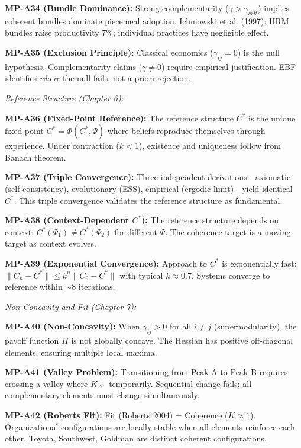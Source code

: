 \begin{tcolorbox}[colback=gray!5!white, colframe=gray!75!black,
    title=\textbf{MP Axioms}]
\textbf{MP-A34 (Bundle Dominance):} Strong complementarity ($\gamma > \gamma_{crit}$) implies coherent bundles dominate piecemeal adoption. Ichniowski et al. (1997): HRM bundles raise productivity 7\%; individual practices have negligible effect.

\textbf{MP-A35 (Exclusion Principle):} Classical economics ($\gamma_{ij} = 0$) is the null hypothesis. Complementarity claims ($\gamma \neq 0$) require empirical justification. EBF identifies \textit{where} the null fails, not a priori rejection.

\vspace{0.5em}
\textit{Reference Structure (Chapter 6):}

\textbf{MP-A36 (Fixed-Point Reference):} The reference structure $C^*$ is the unique fixed point $C^* = \Phi(C^*, \Psi)$ where beliefs reproduce themselves through experience. Under contraction ($k < 1$), existence and uniqueness follow from Banach theorem.

\textbf{MP-A37 (Triple Convergence):} Three independent derivations---axiomatic (self-consistency), evolutionary (ESS), empirical (ergodic limit)---yield identical $C^*$. This triple convergence validates the reference structure as fundamental.

\textbf{MP-A38 (Context-Dependent $C^*$):} The reference structure depends on context: $C^*(\Psi_1) \neq C^*(\Psi_2)$ for different $\Psi$. The coherence target is a moving target as context evolves.

\textbf{MP-A39 (Exponential Convergence):} Approach to $C^*$ is exponentially fast: $\|C_n - C^*\| \leq k^n \|C_0 - C^*\|$ with typical $k \approx 0.7$. Systems converge to reference within $\sim$8 iterations.

\vspace{0.5em}
\textit{Non-Concavity and Fit (Chapter 7):}

\textbf{MP-A40 (Non-Concavity):} When $\gamma_{ij} > 0$ for all $i \neq j$ (supermodularity), the payoff function $\Pi$ is not globally concave. The Hessian has positive off-diagonal elements, ensuring multiple local maxima.

\textbf{MP-A41 (Valley Problem):} Transitioning from Peak A to Peak B requires crossing a valley where $K \downarrow$ temporarily. Sequential change fails; all complementary elements must change simultaneously.

\textbf{MP-A42 (Roberts Fit):} Fit (Roberts 2004) = Coherence ($K \approx 1$). Organizational configurations are locally stable when all elements reinforce each other. Toyota, Southwest, Goldman are distinct coherent configurations.


\end{tcolorbox}
